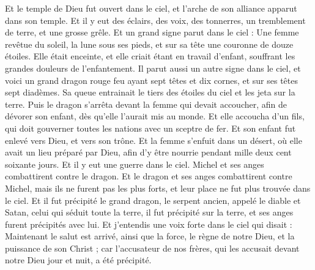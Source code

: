 \begin{multicols}{2}
Et le temple de Dieu fut ouvert dans le ciel, et l'arche de son alliance apparut dans son temple. Et il y eut des éclairs, des voix, des tonnerres, un tremblement de terre, et une grosse grêle.
\VerseOne{}Et un grand signe parut dans le ciel : Une femme revêtue du soleil, la lune sous ses pieds, et sur sa tête une couronne de douze étoiles.
Elle était enceinte, et elle criait étant en travail d'enfant, souffrant les grandes douleurs de l'enfantement.
Il parut aussi un autre signe dans le ciel, et voici un grand dragon rouge feu ayant sept têtes et dix cornes, et sur ses têtes sept diadèmes.
Sa queue entrainait le tiers des étoiles du ciel et les jeta sur la terre. Puis le dragon s'arrêta devant la femme qui devait accoucher, afin de dévorer son enfant, dès qu'elle l'aurait mis au monde.
Et elle accoucha d'un fils, qui doit gouverner toutes les nations avec un sceptre de fer. Et son enfant fut enlevé vers Dieu, et vers son trône.
Et la femme s'enfuit dans un désert, où elle avait un lieu préparé par Dieu, afin d'y être nourrie pendant mille deux cent soixante jours.
Et il y eut une guerre dans le ciel. Michel et ses anges combattirent contre le dragon. Et le dragon et ses anges combattirent contre Michel,
mais ils ne furent pas les plus forts, et leur place ne fut plus trouvée dans le ciel.
Et il fut précipité le grand dragon, le serpent ancien, appelé le diable et Satan, celui qui séduit toute la terre, il fut précipité sur la terre, et ses anges furent précipités avec lui.
Et j'entendis une voix forte dans le ciel qui disait : Maintenant le salut est arrivé, ainsi que la force, le règne de notre Dieu, et la puissance de son Christ ; car l'accusateur de nos frères, qui les accusait devant notre Dieu jour et nuit, a été précipité.

\end{multicols}
